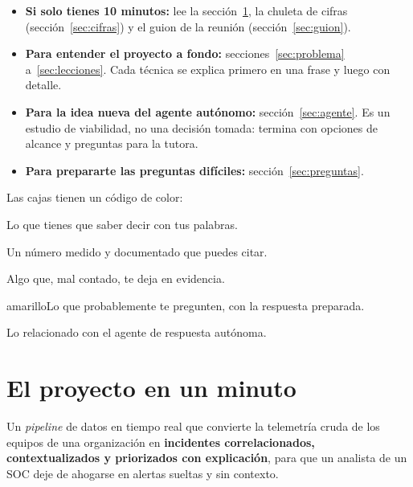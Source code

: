 \documentclass[11pt,a4paper]{article}
\begin{document}
\begin{itemize}
  \item \textbf{Si solo tienes 10 minutos:} lee la sección~\ref{sec:minuto}, la chuleta de cifras
        (sección~\ref{sec:cifras}) y el guion de la reunión (sección~\ref{sec:guion}).
  \item \textbf{Para entender el proyecto a fondo:} secciones~\ref{sec:problema} a~\ref{sec:lecciones}.
        Cada técnica se explica primero en una frase y luego con detalle.
  \item \textbf{Para la idea nueva del agente autónomo:} sección~\ref{sec:agente}. Es un estudio
        de viabilidad, no una decisión tomada: termina con opciones de alcance y preguntas para la tutora.
  \item \textbf{Para prepararte las preguntas difíciles:} sección~\ref{sec:preguntas}.
\end{itemize}

Las cajas tienen un código de color:

\begin{clave}Lo que tienes que saber decir con tus palabras.\end{clave}
\begin{dato}Un número medido y documentado que puedes citar.\end{dato}
\begin{ojo}Algo que, mal contado, te deja en evidencia.\end{ojo}
\begin{pregunta}{amarillo}Lo que probablemente te pregunten, con la respuesta preparada.\end{pregunta}
\begin{nuevo}Lo relacionado con el agente de respuesta autónoma.\end{nuevo}

\newpage
\section{El proyecto en un minuto}\label{sec:minuto}

\begin{resumen}
Un \textit{pipeline} de datos en tiempo real que convierte la telemetría cruda de los equipos de una
organización en \textbf{incidentes correlacionados, contextualizados y priorizados con explicación},
para que un analista de un SOC deje de ahogarse en alertas sueltas y sin contexto.
\end{resumen}
\end{document}
